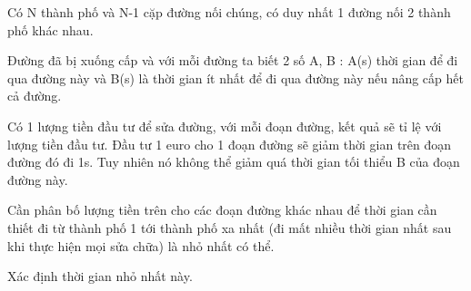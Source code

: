 Có N thành phố và N-1 cặp đường nối chúng, có duy nhất 1 đường nối 2 thành phố khác nhau.

Đường đã bị xuống cấp và với mỗi đường ta biết 2 số A, B : A(s) thời gian để đi qua đường này và B(s) là thời gian ít nhất để đi qua đường này nếu nâng cấp hết cả đường.

Có 1 lượng tiền đầu tư để sửa đường, với mỗi đoạn đường, kết quả sẽ tỉ lệ với lượng tiền đầu tư. Đầu tư 1 euro cho 1 đoạn đường sẽ giảm thời gian trên đoạn đường đó đi 1s. Tuy nhiên nó không thể giảm quá thời gian tối thiểu B của đoạn đường này.

Cần phân bố lượng tiền trên cho các đoạn đường khác nhau để thời gian cần thiết đi từ thành phố 1 tới thành phố xa nhất (đi mất nhiều thời gian nhất sau khi thực hiện mọi sửa chữa) là nhỏ nhất có thể.

Xác định thời gian nhỏ nhất này.